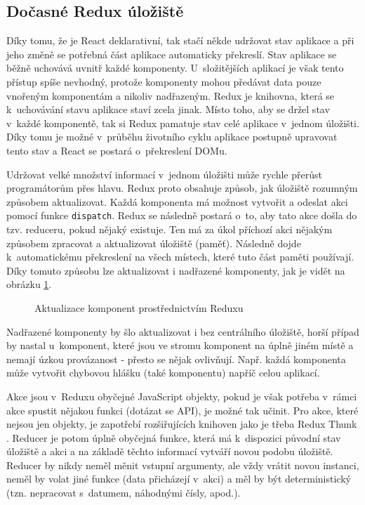 \subsection{Dočasné Redux úložiště}
Díky tomu, že je React deklarativní, tak stačí někde udržovat stav aplikace a při jeho změně se potřebná část aplikace automaticky překreslí. Stav aplikace se běžně uchovává uvnitř každé komponenty. U~složitějších aplikací je však tento přístup spíše nevhodný, protože komponenty mohou předávat data pouze vnořeným komponentám a nikoliv nadřazeným. Redux \cite{redux} je knihovna, která se k~uchovávání stavu aplikace staví zcela jinak. Místo toho, aby se držel stav v~každé komponentě, tak si Redux pamatuje stav celé aplikace v~jednom úložišti. Díky tomu je možné v~průběhu životního cyklu aplikace postupně upravovat tento stav a React se postará o~překreslení DOMu.

Udržovat velké množství informací v~jednom úložišti může rychle přerůst programátorům přes hlavu. Redux proto obsahuje způsob, jak úložiště rozumným způsobem aktualizovat. Každá komponenta má možnost vytvořit a odeslat akci pomocí funkce \texttt{dispatch}. Redux se následně postará o~to, aby tato akce došla do tzv. reduceru, pokud nějaký existuje. Ten má za úkol příchozí akci nějakým způsobem zpracovat a aktualizovat úložiště (paměť). Následně dojde k~automatickému překreslení na všech místech, které tuto část paměti používají. Díky tomuto způsobu lze aktualizovat i nadřazené komponenty, jak je vidět na obrázku \ref{fig:redux}.

\begin{figure}[h]
	\centering
	\caption{Aktualizace komponent prostřednictvím Reduxu}
	\label{fig:redux}
\end{figure}

Nadřazené komponenty by šlo aktualizovat i bez centrálního úložiště, horší případ by nastal u~komponent, které jsou ve stromu komponent na úplně jiném místě a nemají úzkou provázanost - přesto se nějak ovlivňují. Např. každá komponenta může vytvořit chybovou hlášku (také komponentu) napříč celou aplikací.

Akce jsou v~Reduxu obyčejné JavaScript objekty, pokud je však potřeba v~rámci akce spustit nějakou funkci (dotázat se API), je možné tak učinit. Pro akce, které nejsou jen objekty, je zapotřebí rozšiřujících knihoven jako je třeba Redux Thunk \cite{redux-thunk}. Reducer je potom úplně obyčejná funkce, která má k~dispozici původní stav úložiště a akci a na základě těchto informací vytváří novou podobu úložiště. Reducer by nikdy neměl měnit vstupní argumenty, ale vždy vrátit novou instanci, neměl by volat jiné funkce (data přicházejí v~akci) a měl by být deterministický (tzn. nepracovat s~datumem, náhodnými čísly, apod.).

